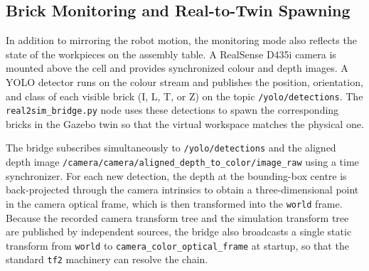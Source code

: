 \subsection{Brick Monitoring and Real-to-Twin Spawning}

In addition to mirroring the robot motion, the monitoring mode also reflects the
state of the workpieces on the assembly table. A RealSense D435i camera is mounted
above the cell and provides synchronized colour and depth images. A YOLO detector
runs on the colour stream and publishes the position, orientation, and class of each
visible brick (I, L, T, or Z) on the topic \texttt{/yolo/detections}. The
\texttt{real2sim\_bridge.py} node uses these detections to spawn the corresponding
bricks in the Gazebo twin so that the virtual workspace matches the physical one.

The bridge subscribes simultaneously to \texttt{/yolo/detections} and the aligned
depth image \texttt{/camera/camera/aligned\_depth\_to\_color/image\_raw} using a
time synchronizer. For each new detection, the depth at the bounding-box centre is
back-projected through the camera intrinsics to obtain a three-dimensional point in
the camera optical frame, which is then transformed into the \texttt{world} frame.
Because the recorded camera transform tree and the simulation transform tree are
published by independent sources, the bridge also broadcasts a single static
transform from \texttt{world} to \texttt{camera\_color\_optical\_frame} at startup,
so that the standard \texttt{tf2} machinery can resolve the chain.

